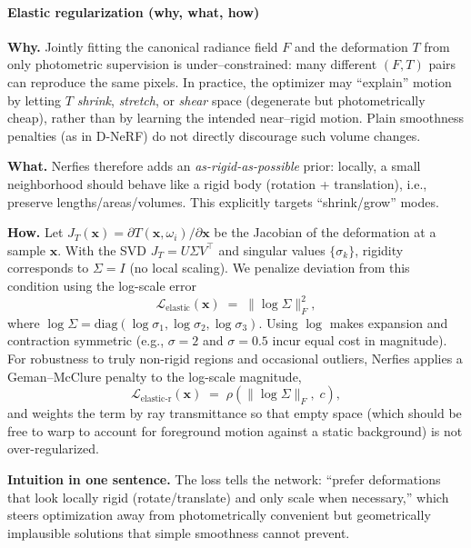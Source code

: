\begin{enrichment}
\begin{enrichment}
        \paragraph{Elastic regularization (why, what, how)}
        \textbf{Why.} Jointly fitting the canonical radiance field $F$ and the deformation $T$ from only photometric supervision is under–constrained: many different $(F,T)$ pairs can reproduce the same pixels. In practice, the optimizer may “explain” motion by letting $T$ \emph{shrink}, \emph{stretch}, or \emph{shear} space (degenerate but photometrically cheap), rather than by learning the intended near–rigid motion. Plain smoothness penalties (as in D-NeRF) do not directly discourage such volume changes.
        
        \medskip
        \textbf{What.} Nerfies therefore adds an \emph{as-rigid-as-possible} prior: locally, a small neighborhood should behave like a rigid body (rotation + translation), i.e., preserve lengths/areas/volumes. This explicitly targets “shrink/grow” modes.
        
        \medskip
        \textbf{How.} Let $J_T(\mathbf{x})=\partial T(\mathbf{x},\omega_i)/\partial\mathbf{x}$ be the Jacobian of the deformation at a sample $\mathbf{x}$. With the SVD $J_T=U\Sigma V^\top$ and singular values $\{\sigma_k\}$, rigidity corresponds to $\Sigma=I$ (no local scaling). We penalize deviation from this condition using the log-scale error
        \[
        \mathcal{L}_{\text{elastic}}(\mathbf{x}) \;=\; \big\|\log \Sigma\big\|_F^2,
        \]
        where $\log\Sigma=\mathrm{diag}(\log\sigma_1,\log\sigma_2,\log\sigma_3)$. Using $\log$ makes expansion and contraction symmetric (e.g., $\sigma{=}2$ and $\sigma{=}0.5$ incur equal cost in magnitude). For robustness to truly non-rigid regions and occasional outliers, Nerfies applies a Geman–McClure penalty to the log-scale magnitude,
        \[
        \mathcal{L}_{\text{elastic-r}}(\mathbf{x}) \;=\; \rho\!\left(\big\|\log\Sigma\big\|_F,\;c\right),
        \]
        and weights the term by ray transmittance so that empty space (which should be free to warp to account for foreground motion against a static background) is not over-regularized.
        
        \medskip
        \textbf{Intuition in one sentence.} The loss tells the network: “prefer deformations that look locally rigid (rotate/translate) and only scale when necessary,” which steers optimization away from photometrically convenient but geometrically implausible solutions that simple smoothness cannot prevent.
        

\end{enrichment}
\end{enrichment}
